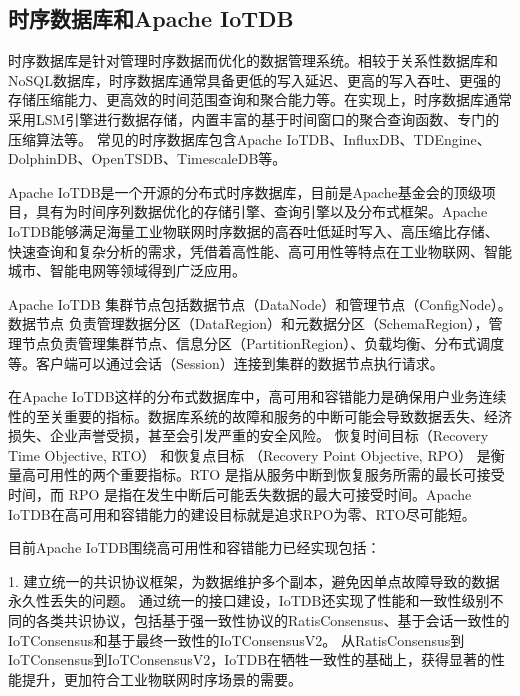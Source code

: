 \subsection{时序数据库和Apache IoTDB}

时序数据库\cite{naqvi2017timeseriesdb}是针对管理时序数据而优化的数据管理系统。相较于关系性数据库\cite{codd2007relational}和NoSQL数据库\cite{han2011surveynosql}，时序数据库通常具备更低的写入延迟、更高的写入吞吐、更强的存储压缩能力、更高效的时间范围查询和聚合能力等。在实现上，时序数据库通常采用LSM\cite{o1996lsmtree}引擎进行数据存储，内置丰富的基于时间窗口的聚合查询函数、专门的压缩算法等。
常见的时序数据库包含Apache IoTDB\cite{wang2020iotdb}、InfluxDB\cite{shahid2019influxdb}、TDEngine\cite{tdengine_website}、DolphinDB\cite{dolphindb_website}、OpenTSDB\cite{opentsdb_website}、TimescaleDB\cite{timescale_website}等。

Apache IoTDB是一个开源的分布式时序数据库，目前是Apache基金会的顶级项目，具有为时间序列数据优化的存储引擎、查询引擎以及分布式框架。Apache IoTDB能够满足海量工业物联网时序数据的高吞吐低延时写入、高压缩比存储、快速查询和复杂分析的需求，凭借着高性能、高可用性等特点在工业物联网、智能城市、智能电网等领域得到广泛应用。

Apache IoTDB 集群节点包括数据节点（DataNode）和管理节点（ConfigNode）。数据节点
负责管理数据分区（DataRegion）和元数据分区（SchemaRegion），管理节点负责管理集群节点、信息分区（PartitionRegion）、负载均衡、分布式调度等。客户端可以通过会话（Session）连接到集群的数据节点执行请求。

在Apache IoTDB这样的分布式数据库中，高可用和容错能力\cite{gray2002high}是确保用户业务连续性的至关重要的指标。数据库系统的故障和服务的中断可能会导致数据丢失、经济损失、企业声誉受损，甚至会引发严重的安全风险。
恢复时间目标（Recovery Time Objective, RTO） 和恢复点目标 （Recovery Point Objective, RPO） \cite{suguna2014overview}是衡量高可用性的两个重要指标。RTO 是指从服务中断到恢复服务所需的最长可接受时间，而 RPO 是指在发生中断后可能丢失数据的最大可接受时间。Apache IoTDB在高可用和容错能力的建设目标就是追求RPO为零、RTO尽可能短。

目前Apache IoTDB围绕高可用性和容错能力已经实现包括：

1. 建立统一的共识协议框架，为数据维护多个副本，避免因单点故障导致的数据永久性丢失的问题。
通过统一的接口建设，IoTDB还实现了性能和一致性级别不同的各类共识协议，包括基于强一致性协议的RatisConsensus、基于会话一致性的IoTConsensus和基于最终一致性的IoTConsensusV2。
从RatisConsensus到IoTConsensus到IoTConsensusV2，IoTDB在牺牲一致性的基础上，获得显著的性能提升，更加符合工业物联网时序场景的需要。

